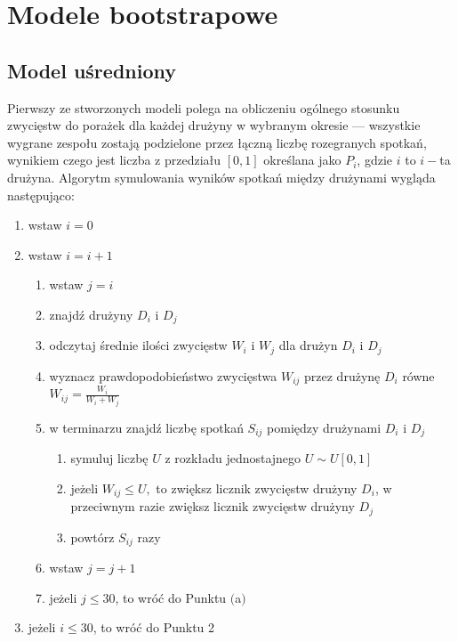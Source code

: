 \documentclass[inzynierska]{pwr_wmat_praca_dyplomowa}
\theoremstyle{plain}
\numberwithin{theorem}{chapter}
\theoremstyle{definition}
\numberwithin{theorem}{chapter}
\begin{document}
\section{Modele bootstrapowe}

\subsection{Model uśredniony}
Pierwszy ze stworzonych modeli polega na obliczeniu ogólnego stosunku zwycięstw do porażek dla każdej drużyny w wybranym okresie --- wszystkie wygrane zespołu zostają podzielone przez łączną liczbę rozegranych spotkań, wynikiem czego jest liczba z przedziału $[0,1]$ określana jako $P_{i}$, gdzie $i$ to $i-$ta drużyna. Algorytm symulowania wyników spotkań między drużynami wygląda następująco:
\begin{enumerate}
	\item wstaw $i=0$
	\item wstaw $i=i+1$ 
	\begin{enumerate}
		\item wstaw $j=i$
		\item znajdź drużyny $D_i$ i $D_j$
		\item odczytaj średnie ilości zwycięstw $W_i$ i $W_j$ dla drużyn $D_i$ i $D_j$ 
		\item wyznacz prawdopodobieństwo zwycięstwa $W_{ij}$ przez drużynę  $D_i$ równe $W_{ij}=\frac{W_i}{W_i + W_j}$   
		\item w terminarzu znajdź liczbę spotkań $S_{ij}$ pomiędzy drużynami $D_i$ i $D_j$
			\begin{enumerate}
				\item symuluj liczbę $U$ z rozkładu jednostajnego $U\sim U[0,1]$ 
			\item jeżeli $W_{ij} \leq U,$ to zwiększ licznik zwycięstw drużyny $D_i$, w przeciwnym razie zwiększ licznik zwycięstw drużyny $D_j$
			\item powtórz $S_{ij}$ razy
			\end{enumerate}
		\item wstaw $j=j+1$
		\item jeżeli $j\leq 30$, to wróć do Punktu $($a$)$ 
	\end{enumerate}
	\item jeżeli $i\leq 30$, to wróć do Punktu 2
\end{enumerate} 
 
\end{document}
